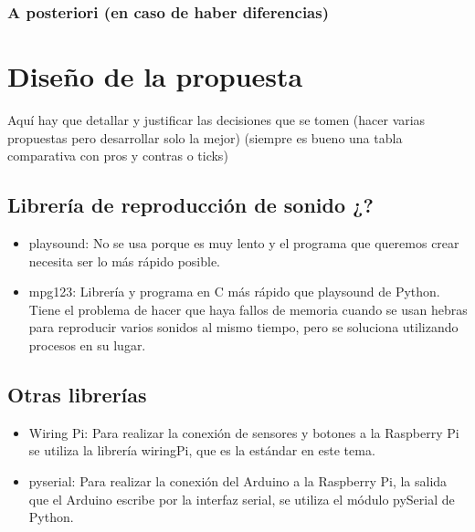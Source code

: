 \documentclass{article}
\begin{document}
 \subsubsection{A posteriori (en caso de haber diferencias)}
\section{Diseño de la propuesta}\label{sec:Diseno}

 Aquí hay que detallar y justificar las decisiones que se tomen (hacer varias propuestas pero desarrollar solo la
 mejor) (siempre es bueno una tabla comparativa con pros y contras o ticks)

 \subsection{Librería de reproducción de sonido ¿?}
 \begin{itemize}
     \item
        playsound\cite{playsound}: No se usa porque es muy lento y el programa que queremos crear necesita ser lo
        más rápido posible.
     \item
        mpg123\cite{mpg123}: Librería y programa en C más rápido que playsound de Python. Tiene el problema de
        hacer que haya fallos de memoria cuando se usan hebras para reproducir varios sonidos al mismo tiempo, pero
        se soluciona utilizando procesos en su lugar.
 \end{itemize}

 \subsection{Otras librerías}
 \begin{itemize}
     \item
        Wiring Pi\cite{wiringPi}: Para realizar la conexión de sensores y botones a la Raspberry Pi se utiliza
        la librería wiringPi, que es la estándar en este tema.
     \item
        pyserial\cite{pyserial}: Para realizar la conexión del Arduino a la Raspberry Pi, la salida que el Arduino
        escribe por la interfaz serial, se utiliza el módulo pySerial de Python.
 \end{itemize}
\end{document}
